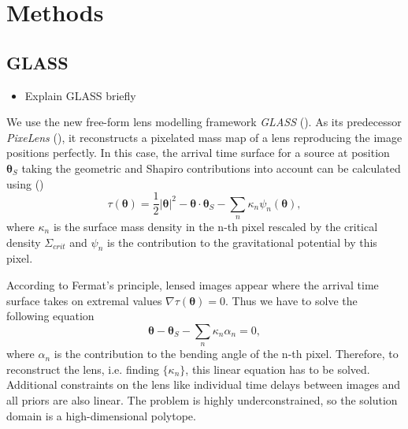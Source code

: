 \documentclass[10pt]{article}
\begin{document}
\section{Methods}
\subsection{GLASS}
\begin{itemize}
\item Explain GLASS briefly
\end{itemize}

We use the new free-form lens modelling framework \textit{GLASS} (\cite{2012MNRAS.425.3077L}). As its predecessor \textit{PixeLens} (\cite{2004AJ....127.2604S}), it reconstructs a pixelated mass map of a lens reproducing the image positions perfectly. In this case, the arrival time surface for a source at position $\boldsymbol\theta_{S}$ taking the geometric and Shapiro contributions into account can be calculated using (\cite{1997MNRAS.292..148S})
\begin{equation}
\tau(\boldsymbol\theta)=\frac{1}{2}|\boldsymbol\theta |^{2}-\boldsymbol\theta\cdot\boldsymbol\theta_{S}-\displaystyle\sum\limits_{n} \kappa_{n}\psi_{n}(\boldsymbol\theta),
\end{equation}
where $\kappa_{n}$ is the surface mass density in the n-th pixel rescaled by the critical density $\Sigma_{crit}$ and $\psi_{n}$ is the contribution to the gravitational potential by this pixel.

According to Fermat's principle, lensed images appear where the arrival time surface takes on extremal values $\nabla\tau(\boldsymbol\theta)=0$. Thus we have to solve the following equation
\begin{equation}
\boldsymbol\theta-\boldsymbol\theta_{S}-\displaystyle\sum\limits_{n} \kappa_{n}\alpha_{n}=0,
\end{equation}
where $\alpha_{n}$ is the contribution to the bending angle of the n-th pixel. Therefore, to reconstruct the lens, i.e. finding $\{\kappa_{n}\}$, this linear equation has to be solved. Additional constraints on the lens like individual time delays between images and all priors are also linear. The problem is highly underconstrained, so the solution domain is a high-dimensional polytope.
\end{document}
